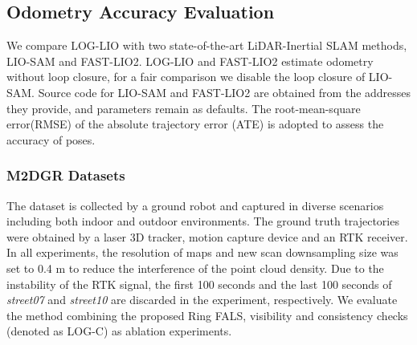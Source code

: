 \documentclass[letterpaper, 10 pt, conference]{ieeeconf}  %
\begin{document}
\subsection{Odometry Accuracy Evaluation}
We compare LOG-LIO with two state-of-the-art LiDAR-Inertial SLAM methods, LIO-SAM\cite{shan2020lio} and FAST-LIO2\cite{xu2022fast}.
LOG-LIO and FAST-LIO2 estimate odometry without loop closure, for a fair comparison we disable the loop closure of LIO-SAM.
Source code for LIO-SAM and FAST-LIO2 are obtained from the addresses they provide, and parameters remain as defaults.
The root-mean-square error(RMSE) of the absolute trajectory error (ATE) is adopted to assess the accuracy of poses.

\subsubsection{M2DGR Datasets}
The dataset is collected by a ground robot and captured in diverse scenarios including both indoor and outdoor environments.
The ground truth trajectories were obtained by a laser 3D tracker, motion capture device and an RTK receiver.
In all experiments, the resolution of maps and new scan downsampling size was set to 0.4 m to reduce the interference of the point cloud density.
Due to the instability of the RTK signal, the first 100 seconds and the last 100 seconds of \emph{street07} and \emph{street10} are discarded in the experiment, respectively.
We evaluate the method combining the proposed Ring FALS, visibility and consistency checks (denoted as LOG-C) as ablation experiments.
\end{document}
